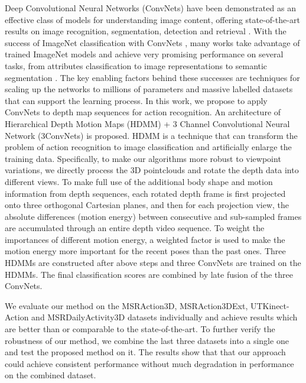 \documentclass[conference]{IEEEtran}
\begin{document}
Deep Convolutional Neural Networks (ConvNets) have been demonstrated as an effective class of models for understanding image content, offering state-of-the-art results on image recognition, segmentation, detection and retrieval \cite{farabet2013learning, sermanet2014overfeat, Razavian2014CVPRW, agrawal14analyzing}. With the success of ImageNet classification with ConvNets \cite{krizhevsky2012imagenet}, many works take advantage of trained ImageNet models and achieve very promising performance on several tasks, from attributes classification \cite{zhang2014panda} to image representations \cite{oquab2014learning} to semantic segmentation \cite{girshick2014rich}. The key enabling factors behind these successes are techniques for scaling up the networks to millions of parameters and massive labelled datasets that can support the learning process. In this work, we propose to apply ConvNets to depth map sequences for action recognition. An architecture of Hierarchical Depth Motion Maps (HDMM) + 3 Channel Convolutional Neural Network (3ConvNets) is proposed. HDMM is a technique that can transform the problem of action recognition to image classification and artificially enlarge the training data. Specifically, to make our algorithms more robust to viewpoint variations, we directly process the 3D pointclouds and rotate the depth data into different views. To make full use of the additional body shape and motion information from depth sequences, each rotated depth frame is first projected onto three orthogonal Cartesian planes, and then for each projection view, the absolute differences (motion energy) between consecutive and sub-sampled frames are accumulated through an entire depth video sequence. To weight the importances of different motion energy, a weighted factor is used to make the motion energy more important for the recent poses than the past ones. Three HDMMs are constructed after above steps and three ConvNets are trained on the HDMMs. The final classification scores are combined by late fusion of the three ConvNets.

We evaluate our method on the MSRAction3D, MSRAction3DExt, UTKinect-Action and MSRDailyActivity3D datasets individually and achieve results which are better than or comparable to the state-of-the-art. To further verify the robustness of our method, we combine the last three datasets into a single one and test the proposed method on it. The results show that that our approach could achieve consistent performance without much degradation in performance on the combined dataset.
\end{document}
